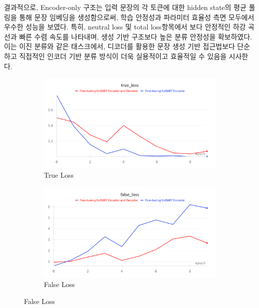 \documentclass[a4paper,fleqn]{cas-sc}
\begin{document}
결과적으로, Encoder-only 구조는 입력 문장의 각 토큰에 대한 hidden state의 평균 풀링을 통해 문장 임베딩을 생성함으로써, 학습 안정성과 파라미터 효율성 측면 모두에서 우수한 성능을 보였다.  
특히, neutral loss 및 total loss항목에서 보다 안정적인 하강 곡선과 빠른 수렴 속도를 나타내며, 생성 기반 구조보다 높은 분류 안정성을 확보하였다.  
이는 이진 분류와 같은 태스크에서, 디코더를 활용한 문장 생성 기반 접근법보다 단순하고 직접적인 인코더 기반 분류 방식이 더욱 실용적이고 효율적일 수 있음을 시사한다.

\begin{figure}[htbp]
    \centering
    
    \begin{subfigure}[b]{0.4\textwidth}
        \centering
        \includegraphics[width=\textwidth]{1_true_loss.png}
        \caption{True Loss}
        \label{fig:acc}
    \end{subfigure}
    \hspace{0.02\textwidth}
    \begin{subfigure}[b]{0.4\textwidth}
        \centering
        \includegraphics[width=\textwidth]{1_false_loss.png}
        \caption{False Loss}
        \label{fig:loss}
    \end{subfigure}
    

\end{figure}
\end{document}
